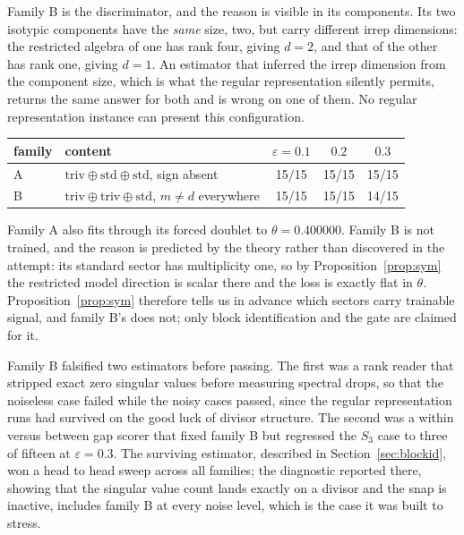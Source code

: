 \documentclass[10pt,a4paper]{amsart}
\begin{document}
Family B is the discriminator, and the reason is visible in its components. Its
two isotypic components have the \emph{same} size, two, but carry different irrep
dimensions: the restricted algebra of one has rank four, giving $d=2$, and that
of the other has rank one, giving $d=1$. An estimator that inferred the irrep
dimension from the component size, which is what the regular representation
silently permits, returns the same answer for both and is wrong on one of them.
No regular representation instance can present this configuration.

\begin{center}
\begin{tabular}{llccc}
\toprule
family & content & $\varepsilon{=}0.1$ & $0.2$ & $0.3$\\
\midrule
A & $\mathrm{triv}\oplus\mathrm{std}\oplus\mathrm{std}$, sign absent &
15/15 & 15/15 & 15/15\\
B & $\mathrm{triv}\oplus\mathrm{triv}\oplus\mathrm{std}$,
$m\ne d$ everywhere & 15/15 & 15/15 & 14/15\\
\bottomrule
\end{tabular}
\end{center}

Family A also fits through its forced doublet to $\theta=0.400000$. Family B is
not trained, and the reason is predicted by the theory rather than discovered in
the attempt: its standard sector has multiplicity one, so by
Proposition~\ref{prop:sym} the restricted model direction is scalar there and the
loss is exactly flat in $\theta$. Proposition~\ref{prop:sym} therefore tells us
in advance which sectors carry trainable signal, and family B's does not; only
block identification and the gate are claimed for it.

Family B falsified two estimators before passing. The first was a rank reader
that stripped exact zero singular values before measuring spectral drops, so that
the noiseless case failed while the noisy cases passed, since the regular
representation runs had survived on the good luck of divisor structure. The
second was a within versus between gap scorer that fixed family B but regressed
the $S_3$ case to three of fifteen at $\varepsilon=0.3$. The surviving estimator,
described in Section~\ref{sec:blockid}, won a head to head sweep across all
families; the diagnostic reported there, showing that the singular value count
lands exactly on a divisor and the snap is inactive, includes family B at every
noise level, which is the case it was built to stress.
\end{document}
